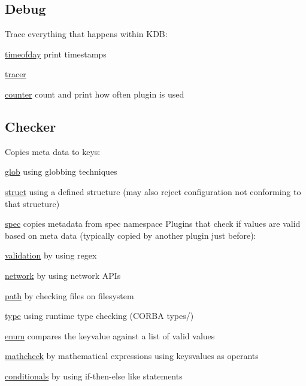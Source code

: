 \subsection*{Debug}

Trace everything that happens within K\+D\+B\+:


\begin{DoxyItemize}
\item \hyperlink{md_src_plugins_timeofday_README_src_plugins_timeofday_README_md}{timeofday} print timestamps
\item \hyperlink{md_src_plugins_tracer_README_src_plugins_tracer_README_md}{tracer}
\item \hyperlink{md_src_plugins_counter_README_src_plugins_counter_README_md}{counter} count and print how often plugin is used
\end{DoxyItemize}

\subsection*{Checker}

Copies meta data to keys\+:


\begin{DoxyItemize}
\item \hyperlink{md_src_plugins_glob_README_src_plugins_glob_README_md}{glob} using globbing techniques
\item \hyperlink{md_src_plugins_struct_README_src_plugins_struct_README_md}{struct} using a defined structure (may also reject configuration not conforming to that structure)
\item \hyperlink{md_src_plugins_spec_README_src_plugins_spec_README_md}{spec} copies metadata from spec namespace Plugins that check if values are valid based on meta data (typically copied by another plugin just before)\+:
\item \hyperlink{md_src_plugins_validation_README_src_plugins_validation_README_md}{validation} by using regex
\item \hyperlink{md_src_plugins_network_README_src_plugins_network_README_md}{network} by using network A\+P\+Is
\item \hyperlink{md_src_plugins_path_README_src_plugins_path_README_md}{path} by checking files on filesystem
\item \hyperlink{md_src_plugins_type_README_src_plugins_type_README_md}{type} using runtime type checking (C\+O\+R\+B\+A types/)
\item \hyperlink{md_src_plugins_enum_README_src_plugins_enum_README_md}{enum} compares the keyvalue against a list of valid values
\item \hyperlink{md_src_plugins_mathcheck_README_src_plugins_mathcheck_README_md}{mathcheck} by mathematical expressions using keysvalues as operants
\item \hyperlink{md_src_plugins_conditionals_README_src_plugins_conditionals_README_md}{conditionals} by using if-\/then-\/else like statements
\end{DoxyItemize}

